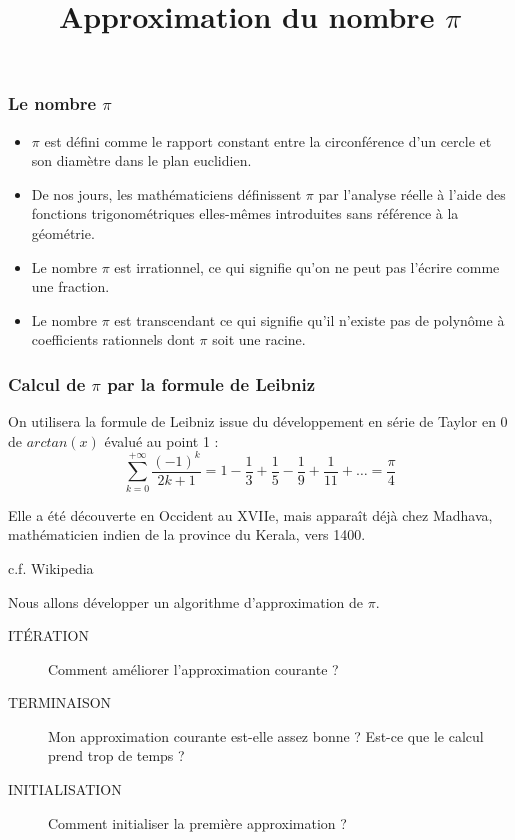 \documentclass[10pt]{beamer}
\title{Approximation du nombre $\pi$}
\begin{document}
\maketitle



\begin{frame}
  \frametitle{Le nombre $\pi$}
  \begin{itemize}
  \item $\pi$ est défini comme le rapport constant entre la circonférence d’un cercle et son diamètre dans le plan euclidien.
  \item De nos jours, les mathématiciens définissent $\pi$ par l’analyse réelle à l’aide des fonctions trigonométriques elles-mêmes introduites sans référence à la géométrie.
  \item Le nombre $\pi$ est \alert{irrationnel}, ce qui signifie qu'on ne peut pas l’écrire comme une fraction.
  \item Le nombre $\pi$ est \alert{transcendant} ce qui signifie qu'il n’existe pas de polynôme à coefficients rationnels dont $\pi$ soit une racine.
  \end{itemize}
\end{frame}


\begin{frame}
  \frametitle{Calcul de $\pi$ par la formule de Leibniz}
  On utilisera la formule de Leibniz issue du développement en série de Taylor en 0 de $arctan(x)$ évalué au point 1 :
  \alert{
    \[
      \sum_{k=0}^{+\infty} \frac{(-1)^k}{2k+ 1} = 1 - \frac{1}{3} + \frac{1}{5}  - \frac{1}{9} + \frac{1}{11} + \ldots = \frac{\pi}{4}
    \]
    }

Elle a été découverte en Occident au XVIIe, mais apparaît déjà chez Madhava, mathématicien indien de la province du Kerala, vers 1400.
\begin{flushright}
c.f. Wikipedia  
\end{flushright}

Nous allons développer un algorithme d'approximation de $\pi$.
  \begin{description}
  \item[ITÉRATION] Comment améliorer l'approximation courante ?
  \item[TERMINAISON] Mon approximation courante est-elle assez bonne ? Est-ce que le calcul prend trop de temps ? 
  \item[INITIALISATION] Comment initialiser la première approximation ? 
  \end{description}

\end{frame}
\end{document}
